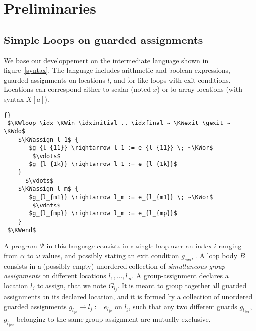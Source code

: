 \documentclass[a4paper,10pt]{article}
\newcommand{\prog}{\ensuremath{\mathcal{P}}\xspace}
\newcommand{\idx}{\ensuremath{i}\xspace}
\newcommand{\idxinitial}{\ensuremath{\alpha}\xspace}
\newcommand{\idxfinal}{\ensuremath{\omega}\xspace}
\newcommand{\KWloop}{\ensuremath{\mathrm{\textbf{loop}}~}}
\newcommand{\KWdo}{\ensuremath{\mathrm{\textbf{do}}~}}
\newcommand{\KWend}{\ensuremath{\mathrm{\textbf{end}}~}}
\newcommand{\KWin}{\ensuremath{~\mathrm{\textbf{in}}~}}
\newcommand{\KWexit}{\ensuremath{\mathrm{\textbf{exit when}}~}}
\newcommand{\KWassign}{\ensuremath{\mathrm{\textbf{assign}}~}}
\newcommand{\KWor}{\ensuremath{\mathrm{\textbf{or}}~}}
\newcommand{\gexit}{\ensuremath{\mathit{g_{exit}~}}}
\begin{document}
\section{Preliminaries}

\subsection{Simple Loops on guarded assignments}
\label{sec:simple-loops}
We base our developpement on the intermediate language shown in figure~\ref{syntax}.
The language includes arithmetic and boolean  expressions, guarded assignments on 
locations $l$, and for-like loops with exit conditions. Locations can correspond 
either to scalar (noted $x$) or to array locations (with syntax $X[a]$).
{
\begin{lstlisting}[mathescape]{} 
 $\KWloop \idx \KWin \idxinitial .. \idxfinal ~ \KWexit \gexit ~ \KWdo$
    $\KWassign l_1$ {
       $g_{l_{11}} \rightarrow l_1 := e_{l_{11}} \; ~\KWor$
        $\vdots$
       $g_{l_{1k}} \rightarrow l_1 := e_{l_{1k}}$
    }
      $\vdots$
    $\KWassign l_m$ { 
       $g_{l_{m1}} \rightarrow l_m := e_{l_{m1}} \; ~\KWor$
        $\vdots$
       $g_{l_{mp}} \rightarrow l_m := e_{l_{mp}}$ 
    }
 $\KWend$
\end{lstlisting}
}

A program \prog in this language consists in a single loop over an index \idx 
ranging from \idxinitial to \idxfinal values, and possibly stating an exit condition \gexit. 
A loop body $B$ consists in a (possibly empty) unordered collection of \emph{simultaneous} 
\textit{group-assignments} on different locations $l_1, \ldots, l_m$.
A group-assignment declares a location $l_j$ to assign, that we note $G_{l_j}$.  
It is meant to group together all guarded assignments on its declared location, 
and it is formed by  a collection of unordered guarded assignments 
$g_{l_{jk}} \rightarrow l_j := e_{l_{jk}}$ on $l_j$, such that any  two different guards 
$g_{l_{jk1}}$, $g_{l_{jk2}}$ belonging to the same group-assignment are mutually exclusive.
\end{document}
